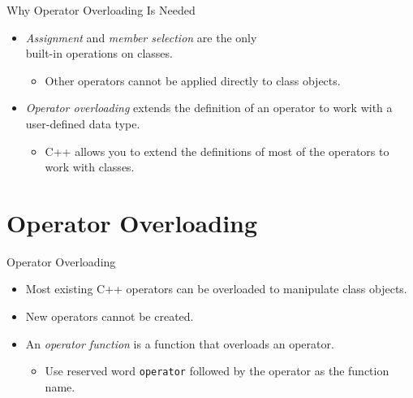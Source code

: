 \documentclass[14pt,aspectratio=1610, hyperref={pdfpagelayout=SinglePage}]{beamer}
\begin{document}
\begin{frame}{Why Operator Overloading Is Needed}
\protect\hypertarget{why-operator-overloading-is-needed-2-of-2}{}
\begin{itemize}
\item
  \textit{Assignment} and \textit{member selection} are the only \\built-in operations on
  classes.
  \begin{itemize}
  \item
    Other operators cannot be applied directly to class objects.
  \end{itemize}
\item
  \emph{Operator overloading} extends the definition of an operator to
  work with a user-defined data type.
  \begin{itemize}
  \item
    C++ allows you to extend the definitions of most of the operators to
    work with classes.
  \end{itemize}
\end{itemize}
\end{frame}

\section{Operator Overloading}

\begin{frame}[fragile]{Operator Overloading}
\protect\hypertarget{operator-overloading}{}
\begin{itemize}
\item
  Most existing C++ operators can be overloaded to manipulate class
  objects.
\item
  New operators cannot be created.
\item
  An \emph{operator function} is a function that overloads an operator.
  \begin{itemize}
  \item
    Use reserved word \lstinline{operator} followed by the operator as
    the function name.
  \end{itemize}
\end{itemize}
\end{frame}
\end{document}
